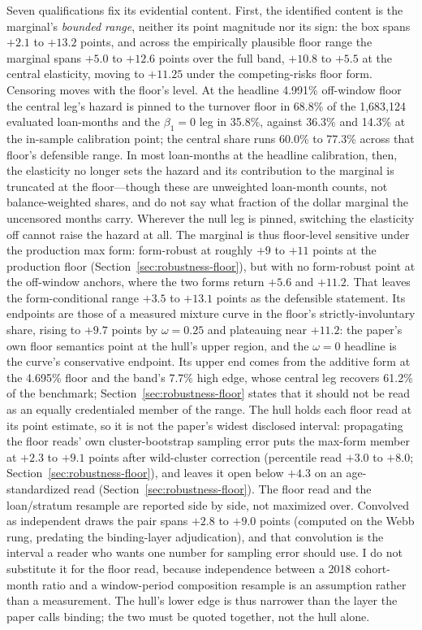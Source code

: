 \documentclass[12pt]{article}
\begin{document}
Seven qualifications fix its evidential content. First, the identified content is the marginal's \emph{bounded range}, neither its point magnitude nor its sign: the box spans $+2.1$ to $+13.2$ points, and across the empirically plausible floor range the marginal spans $+5.0$ to $+12.6$ points over the full band, $+10.8$ to $+5.5$ at the central elasticity, moving to $+11.25$ under the competing-risks floor form. Censoring moves with the floor's level. At the headline 4.991\% off-window floor the central leg's hazard is pinned to the turnover floor in 68.8\% of the 1,683,124 evaluated loan-months and the $\beta_1 = 0$ leg in 35.8\%, against 36.3\% and 14.3\% at the in-sample calibration point; the central share runs 60.0\% to 77.3\% across that floor's defensible range. In most loan-months at the headline calibration, then, the elasticity no longer sets the hazard and its contribution to the marginal is truncated at the floor---though these are unweighted loan-month counts, not balance-weighted shares, and do not say what fraction of the dollar marginal the uncensored months carry. Wherever the null leg is pinned, switching the elasticity off cannot raise the hazard at all. The marginal is thus floor-level sensitive under the production max form: form-robust at roughly $+9$ to $+11$ points at the production floor (Section~\ref{sec:robustness-floor}), but with no form-robust point at the off-window anchors, where the two forms return $+5.6$ and $+11.2$. That leaves the form-conditional range $+3.5$ to $+13.1$ points as the defensible statement. Its endpoints are those of a measured mixture curve in the floor's strictly-involuntary share, rising to $+9.7$ points by $\omega = 0.25$ and plateauing near $+11.2$: the paper's own floor semantics point at the hull's upper region, and the $\omega = 0$ headline is the curve's conservative endpoint. Its upper end comes from the additive form at the 4.695\% floor and the band's 7.7\% high edge, whose central leg recovers 61.2\% of the benchmark; Section~\ref{sec:robustness-floor} states that it should not be read as an equally credentialed member of the range. The hull holds each floor read at its point estimate, so it is not the paper's widest disclosed interval: propagating the floor reads' own cluster-bootstrap sampling error puts the max-form member at $+2.3$ to $+9.1$ points after wild-cluster correction (percentile read $+3.0$ to $+8.0$; Section~\ref{sec:robustness-floor}), and leaves it open below $+4.3$ on an age-standardized read (Section~\ref{sec:robustness-floor}). The floor read and the loan/stratum resample are reported side by side, not maximized over. Convolved as independent draws the pair spans $+2.8$ to $+9.0$ points (computed on the Webb rung, predating the binding-layer adjudication), and that convolution is the interval a reader who wants one number for sampling error should use. I do not substitute it for the floor read, because independence between a 2018 cohort-month ratio and a window-period composition resample is an assumption rather than a measurement. The hull's lower edge is thus narrower than the layer the paper calls binding; the two must be quoted together, not the hull alone.
\end{document}
